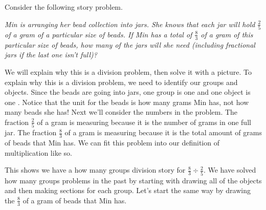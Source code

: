 \documentclass{ximera}
\begin{document}
\begin{example}
Consider the following story problem. 

\emph{Min is arranging her bead collection into jars. She knows that each jar will hold $\frac{2}{5}$ of a gram of a particular size of beads. If Min has a total of $\frac{8}{3}$ of a gram of this particular size of beads, how many of the jars will she need (including fractional jars if the last one isn't full)?}

We will explain why this is a division problem, then solve it with a picture. To explain why this is a division problem, we need to identify our groups and objects. Since the beads are going into jars,  one group is one  and one object is one . Notice that the unit for the beads is how many grams Min has, not how many beads she has! Next we'll consider the numbers in the problem. The fraction $\frac{2}{5}$ of a gram is measuring  because it is the number of grams in one full jar. The fraction $\frac{8}{3}$ of a gram is measuring  because it is the total amount of grams of beads that Min has. We can fit this problem into our definition of multiplication like so.

\begin{image}
\end{image}
This shows we have a how many groups division story for $\frac{8}{3} \div \frac{2}{5}$. We have solved how many groups problems in the past by starting with drawing all of the objects and then making sections for each group. Let's start the same way by drawing the $\frac{8}{3}$ of a gram of beads that Min has.


\end{example}
\end{document}
